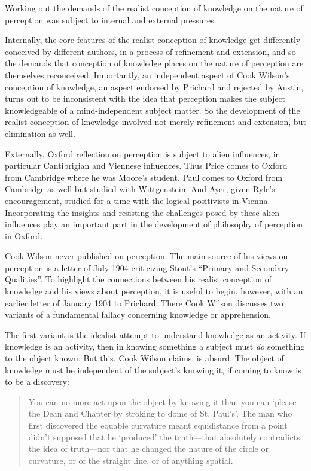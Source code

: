 \documentclass[11pt]{article}
\begin{document}
Working out the demands of the realist conception of knowledge on the nature of perception was subject to internal and external pressures. 

Internally, the core features of the realist conception of knowledge get differently conceived by different authors, in a process of refinement and extension, and so the demands that conception of knowledge places on the nature of perception are themselves reconceived. Importantly, an independent aspect of Cook Wilson's conception of knowledge, an aspect endorsed by Prichard and rejected by Austin, turns out to be inconsistent with the idea that perception makes the subject knowledgeable of a mind-independent subject matter. So the development of the realist conception of knowledge involved not merely refinement and extension, but elimination as well.

Externally, Oxford reflection on perception is subject to alien influences, in particular Cantibrigian and Viennese influences. Thus Price comes to Oxford from Cambridge where he was Moore's student. Paul comes to Oxford from Cambridge as well but studied with Wittgenstein. And Ayer, given Ryle's encouragement, studied for a time with the logical positivists in Vienna. Incorporating the insights and resisting the challenges posed by these alien influences play an important part in the development of philosophy of perception in Oxford.

Cook Wilson never published on perception. The main source of his views on perception is a letter of July 1904 criticizing Stout's ``Primary and Secondary Qualities''. To highlight the connections between his realist conception of knowledge and his views about perception, it is useful to begin, however, with an earlier letter of January 1904 to Prichard. There Cook Wilson discusses two variants of a fundamental fallacy concerning knowledge or apprehension.

The first variant is the idealist attempt to understand knowledge as an activity. If knowledge is an activity, then in knowing something a subject must \emph{do} something to the object known. But this, Cook Wilson claims, is absurd. The object of knowledge must be independent of the subject's knowing it, if coming to know is to be a discovery: 
\begin{quote}
	You can no more act upon the object by knowing it than you can `please the Dean and Chapter by stroking to dome of St. Paul's'. The man who first discovered the equable curvature meant equidistance from a point didn't supposed that he `produced' the truth---that absolutely contradicts the idea of truth---nor that he changed the nature of the circle or curvature, or of the straight line, or of anything spatial.
\end{quote}
\end{document}
